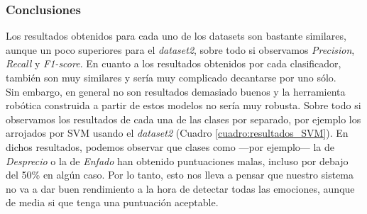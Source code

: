 \subsubsection{Conclusiones}
Los resultados obtenidos para cada uno de los datasets son bastante similares, aunque un poco superiores para el \textit{dataset2}, sobre todo si observamos \textit{Precision}, \textit{Recall} y \textit{F1-score}. En cuanto a los resultados obtenidos por cada clasificador, también son muy similares y sería muy complicado decantarse por uno sólo.\\

Sin embargo, en general no son resultados demasiado buenos y la herramienta robótica construida a partir de estos modelos no sería muy robusta. Sobre todo si observamos los resultados de cada una de las clases por separado, por ejemplo los arrojados por SVM usando el \textit{dataset2} (Cuadro \ref{cuadro:resultados_SVM}). En dichos resultados, podemos observar que clases como ---por ejemplo--- la de \textit{Desprecio} o la de \textit{Enfado} han obtenido puntuaciones malas, incluso por debajo del 50\% en algún caso. Por lo tanto, esto nos lleva a pensar que nuestro sistema no va a dar buen rendimiento a la hora de detectar todas las emociones, aunque de media si que tenga una puntuación aceptable.\\


